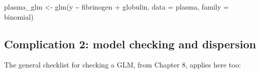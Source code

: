 \documentclass[
  letterpaper,
  8pt,
  a4paper]{book}
\newenvironment{Shaded}{\begin{snugshade}}{\end{snugshade}}
\newcommand{\AttributeTok}[1]{\textcolor[rgb]{0.40,0.45,0.13}{#1}}
\newcommand{\FunctionTok}[1]{\textcolor[rgb]{0.28,0.35,0.67}{#1}}
\newcommand{\NormalTok}[1]{\textcolor[rgb]{0.00,0.23,0.31}{#1}}
\newcommand{\OtherTok}[1]{\textcolor[rgb]{0.00,0.23,0.31}{#1}}
\newcommand{\SpecialCharTok}[1]{\textcolor[rgb]{0.37,0.37,0.37}{#1}}
\begin{document}
\begin{Shaded}
\begin{Highlighting}[]
\NormalTok{plasma\_glm }\OtherTok{\textless{}{-}} \FunctionTok{glm}\NormalTok{(y }\SpecialCharTok{\textasciitilde{}}\NormalTok{ fibrinogen }\SpecialCharTok{+}\NormalTok{ globulin, }\AttributeTok{data =}\NormalTok{ plasma, }\AttributeTok{family =}\NormalTok{ binomial)}
\end{Highlighting}
\end{Shaded}

\subsection*{Complication 2: model checking and
dispersion}\label{complication-2-model-checking-and-dispersion}

The general checklist for checking a GLM, from Chapter 8, applies here
too:
\end{document}
